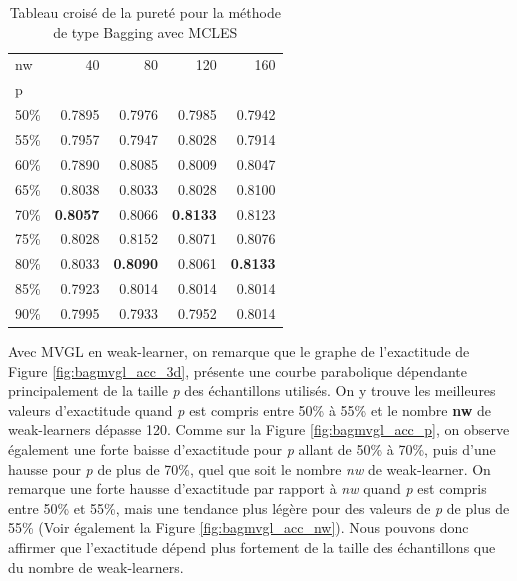 	\begin{table}[h!]
  		 \caption{Tableau croisé de la pureté pour la méthode de type Bagging avec MCLES}
  		 \centering
    	\begin{tabular}{lrrrr}
    	\toprule
    	nw & 40 & 80 & 120 & 160 \\
    	p &  &  &  &  \\
    	\midrule
    	50\% & 0.7895 & 0.7976 & 0.7985 & 0.7942 \\
    	55\% & 0.7957 & 0.7947 & 0.8028 & 0.7914 \\
    	60\% & 0.7890 & 0.8085 & 0.8009 & 0.8047 \\
    	65\% & 0.8038 & 0.8033 & 0.8028 & 0.8100 \\
    	70\% & \textbf{0.8057} & 0.8066 & \textbf{0.8133} & 0.8123 \\
    	75\% & 0.8028 & 0.8152 & 0.8071 & 0.8076 \\
    	80\% & 0.8033 & \textbf{0.8090} & 0.8061 & \textbf{0.8133} \\
    	85\% & 0.7923 & 0.8014 & 0.8014 & 0.8014 \\
    	90\% & 0.7995 & 0.7933 & 0.7952 & 0.8014 \\
    	\bottomrule
    	\end{tabular}
  		 \label{table:pur_mcles}
	\end{table}
    
    Avec MVGL en weak-learner, on remarque que le graphe de l'exactitude de Figure \ref{fig:bagmvgl_acc_3d}, présente une courbe parabolique dépendante principalement de la taille \textit{p} des échantillons utilisés.
    On y trouve les meilleures valeurs d'exactitude quand \textit{p} est compris entre 50\% à 55\% et le nombre \textbf{nw} de weak-learners dépasse 120.
    Comme sur la Figure \ref{fig:bagmvgl_acc_p}, on observe également une forte baisse d'exactitude pour \textit{p} allant de 50\% à 70\%, puis d'une hausse pour \textit{p} de plus de 70\%, quel que soit le nombre \textit{nw} de weak-learner.
    On remarque une forte hausse d'exactitude par rapport à \textit{nw} quand  \textit{p} est compris entre 50\% et 55\%, mais une tendance plus légère pour des valeurs de  \textit{p} de plus de 55\% (Voir également la Figure \ref{fig:bagmvgl_acc_nw}).
    Nous pouvons donc affirmer que l'exactitude dépend plus fortement de la taille des échantillons que du nombre de weak-learners.

